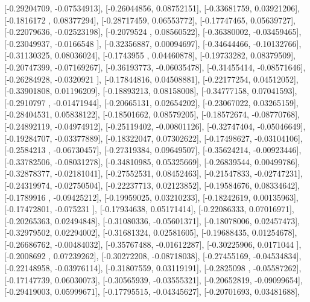 \documentclass{article}
\begin{document}
       [-0.29204709, -0.07534913],
       [-0.26044856,  0.08752151],
       [-0.33681759,  0.03921206],
       [-0.1816172 ,  0.08377294],
       [-0.28717459,  0.06553772],
       [-0.17747465,  0.05639727],
       [-0.22079636, -0.02523198],
       [-0.2079524 ,  0.08560522],
       [-0.36380002, -0.03459465],
       [-0.23049937, -0.0166548 ],
       [-0.32356887,  0.00094697],
       [-0.34644466, -0.10132766],
       [-0.31130325,  0.08036024],
       [-0.1743955 ,  0.04460878],
       [-0.19733282,  0.08379509],
       [-0.20747399, -0.07169267],
       [-0.36193773, -0.06035478],
       [-0.31455414, -0.08571646],
       [-0.26284928, -0.0320921 ],
       [-0.17844816,  0.04508881],
       [-0.22177254,  0.04512052],
       [-0.33901808,  0.01196209],
       [-0.18893213,  0.08158008],
       [-0.34777158,  0.07041593],
       [-0.2910797 , -0.01471944],
       [-0.20665131,  0.02654202],
       [-0.23067022,  0.03265159],
       [-0.28404531,  0.05838122],
       [-0.18501662,  0.08579205],
       [-0.18572674, -0.08770768],
       [-0.24892119, -0.04974912],
       [-0.25119402, -0.00801126],
       [-0.32747404, -0.05046649],
       [-0.19284707, -0.03377889],
       [-0.18322047,  0.07302622],
       [-0.17498627, -0.03104106],
       [-0.2584213 , -0.06730457],
       [-0.27319384,  0.09649507],
       [-0.35624214, -0.00923446],
       [-0.33782506, -0.08031278],
       [-0.34810985,  0.05325669],
       [-0.26839544,  0.00499786],
       [-0.32878377, -0.02181041],
       [-0.27552531,  0.08452463],
       [-0.21547833, -0.02747231],
       [-0.24319974, -0.02750504],
       [-0.22237713,  0.02123852],
       [-0.19584676,  0.08334642],
       [-0.1789916 , -0.09425212],
       [-0.19959025,  0.03210233],
       [-0.18242619,  0.00135963],
       [-0.17472801, -0.075231  ],
       [-0.17934638,  0.05171414],
       [-0.22086333,  0.07016971],
       [-0.20265363,  0.02494848],
       [-0.31080336, -0.05601371],
       [-0.18078006,  0.02457473],
       [-0.32979502,  0.02294002],
       [-0.31681324,  0.02581605],
       [-0.19688435,  0.01254678],
       [-0.26686762, -0.00484032],
       [-0.35767488, -0.01612287],
       [-0.30225906,  0.0171044 ],
       [-0.2008692 ,  0.07239262],
       [-0.30272208, -0.08718038],
       [-0.27455169, -0.04534834],
       [-0.22148958, -0.03976114],
       [-0.31807559,  0.03119191],
       [-0.2825098 , -0.05587262],
       [-0.17147739,  0.06030073],
       [-0.30565939, -0.03555321],
       [-0.20652819, -0.09099654],
       [-0.29419003,  0.05999671],
       [-0.17795515, -0.04345627],
       [-0.20701693,  0.03481688],
\end{document}
